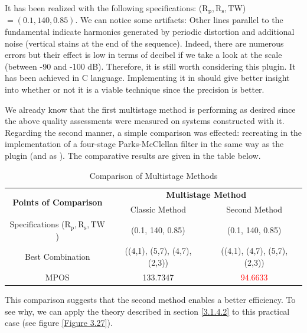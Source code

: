 It has been realized with the following specifications: ($\text{R}_\text{p}, \text{R}_\text{s}, \text{TW}$) $= (0.1, 140, 0.85)$. We can notice some artifacts: Other lines parallel to the fundamental indicate harmonics generated by periodic distortion
and additional noise (vertical stains at the end of the sequence). Indeed, there are numerous errors but their effect is low in terms of decibel if we take a look at the scale (between -90 and -100 \si{dB}). Therefore, it is still worth considering this plugin. It has been achieved in C language. Implementing it in \MATLAB should give better insight into whether or not it is a viable technique since the precision is better. 


We already know that the first multistage method is performing as desired since the above quality assessments were measured on systems constructed with it. Regarding the second manner, a simple comparison was effected: recreating in \MATLAB the implementation of a four-stage Parks-McClellan filter in the same way as the plugin (and as \cite{crochiere}). The comparative results are given in the table below.



\begin{table}[ht!]
	\hspace*{0.5cm}
	\begin{tabular}{|c|c|l|c|l|}
		\hline
		\multirow{2}{*}{\textbf{Points of Comparison}} & \multicolumn{4}{c|}{\textbf{Multistage Method}}                                   \\ %
		& \multicolumn{2}{c}{Classic Method} & \multicolumn{2}{c|}{Second Method} \\ \ChangeRT{1.2pt}
		Specifications ($\text{R}_\text{p}, \text{R}_\text{s}, \text{TW}$) & \multicolumn{2}{c|}{(0.1, 140, 0.85)}               & \multicolumn{2}{c|}{(0.1, 140, 0.85)}              \\ \hline
		Best Combination & \multicolumn{2}{c|}{((4,1), (5,7), (4,7), (2,3))}               & \multicolumn{2}{c|}{((4,1), (4,7), (5,7), (2,3))}              \\ \hline
		MPOS & \multicolumn{2}{c|}{133.7347}               & \multicolumn{2}{c|}{\textcolor{red}{94.6633}}              \\ \hline
	\end{tabular}
\captionsetup{width=0.95\linewidth}
\caption{Comparison of Multistage Methods}
\label{tab:comp_smarc}
\end{table}


This comparison suggests that the second method enables a better efficiency. To see why, we can apply the theory described in section \ref{3.1.4.2} to this practical case (see figure \ref{Figure 3.27}). 


